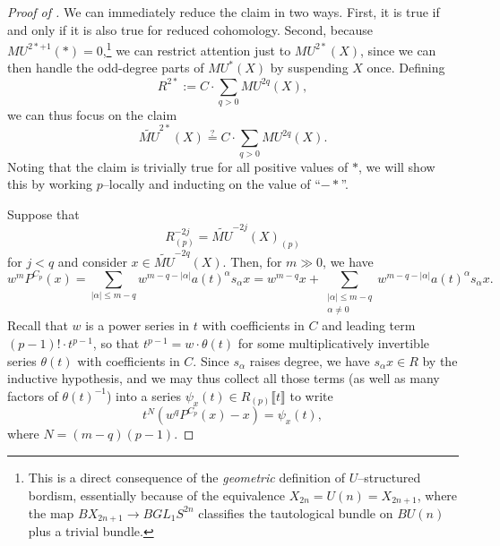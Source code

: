 \begin{proof}[{Proof of }]
We can immediately reduce the claim in two ways.  First, it is true if and only if it is also true for reduced cohomology.  Second, because $MU^{2*+1}(*) = 0$,\footnote{This is a direct consequence of the \emph{geometric} definition of $U$--structured bordism, essentially because of the equivalence $X_{2n} = U(n) = X_{2n+1}$, where the map $BX_{2n+1} \to BGL_1 S^{2n}$ classifies the tautological bundle on $BU(n)$ plus a trivial bundle.} we can restrict attention just to $MU^{2*}(X)$, since we can then handle the odd-degree parts of $MU^*(X)$ by suspending $X$ once.  Defining \[R^{2*} := C \cdot \sum_{q > 0} MU^{2q}(X),\] we can thus focus on the claim \[\widetilde{MU}^{2*}(X) \stackrel{?}{=} C \cdot \sum_{q > 0} MU^{2q}(X).\]  Noting that the claim is trivially true for all positive values of $*$, we will show this by working $p$--locally and inducting on the value of ``$-*$''.

Suppose that \[R^{-2j}_{(p)} = \widetilde{MU}^{-2j}(X)_{(p)}\] for $j < q$ and consider $x \in \widetilde{MU}^{-2q}(X)$.  Then, for $m \gg 0$, we have \[w^m P^{C_p}(x) = \sum_{|\alpha| \le m-q} w^{m-q - |\alpha|} a(t)^\alpha s_\alpha x = w^{m-q} x + \sum_{\substack{|\alpha| \le m-q \\ \alpha \ne 0}} w^{m-q - |\alpha|} a(t)^\alpha s_\alpha x.\]  Recall that $w$ is a power series in $t$ with coefficients in $C$ and leading term $(p-1)! \cdot t^{p-1}$, so that $t^{p-1} = w \cdot \theta(t)$ for some multiplicatively invertible series $\theta(t)$ with coefficients in $C$.  Since $s_\alpha$ raises degree, we have $s_\alpha x \in R$ by the inductive hypothesis, and we may thus collect all those terms (as well as many factors of $\theta(t)^{-1}$) into a series $\psi_x(t) \in R_{(p)}\llbracket t \rrbracket$ to write \[t^N(w^q P^{C_p}(x) - x) = \psi_x(t),\] where $N = (m-q)(p-1)$.


\end{proof}
